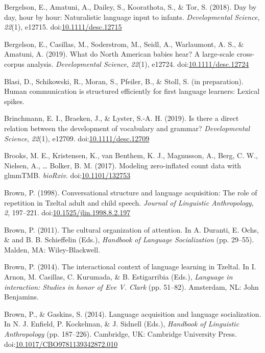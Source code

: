 \documentclass[floatsintext,man]{apa6}
\theoremstyle{definition}
\theoremstyle{definition}
\theoremstyle{definition}
\theoremstyle{remark}
\begin{document}
\hypertarget{ref-bergelson2018day}{}
Bergelson, E., Amatuni, A., Dailey, S., Koorathota, S., \& Tor, S.
(2018). Day by day, hour by hour: Naturalistic language input to
infants. \emph{Developmental Science}, \emph{22}(1), e12715.
doi:\href{https://doi.org/10.1111/desc.12715}{10.1111/desc.12715}

\hypertarget{ref-bergelsoncasillas2019what}{}
Bergelson, E., Casillas, M., Soderstrom, M., Seidl, A., Warlaumont, A.
S., \& Amatuni, A. (2019). What do North American babies hear? A
large-scale cross-corpus analysis. \emph{Developmental Science},
\emph{22}(1), e12724.
doi:\href{https://doi.org/10.1111/desc.12724}{10.1111/desc.12724}

\hypertarget{ref-blasiIPhuman}{}
Blasi, D., Schikowski, R., Moran, S., Pfeiler, B., \& Stoll, S. (in
preparation). Human communication is structured efficiently for first
language learners: Lexical spikes.

\hypertarget{ref-brinchmann2019direct}{}
Brinchmann, E. I., Braeken, J., \& Lyster, S.-A. H. (2019). Is there a
direct relation between the development of vocabulary and grammar?
\emph{Developmental Science}, \emph{22}(1), e12709.
doi:\href{https://doi.org/10.1111/desc.12709}{10.1111/desc.12709}

\hypertarget{ref-brooks2017modeling}{}
Brooks, M. E., Kristensen, K., van Benthem, K. J., Magnusson, A., Berg,
C. W., Nielsen, A., \ldots{} Bolker, B. M. (2017). Modeling
zero-inflated count data with glmmTMB. \emph{bioRxiv}.
doi:\href{https://doi.org/10.1101/132753}{10.1101/132753}

\hypertarget{ref-brown1998conversational}{}
Brown, P. (1998). Conversational structure and language acquisition: The
role of repetition in Tzeltal adult and child speech. \emph{Journal of
Linguistic Anthropology}, \emph{2}, 197--221.
doi:\href{https://doi.org/10.1525/jlin.1998.8.2.197}{10.1525/jlin.1998.8.2.197}

\hypertarget{ref-brown2011cultural}{}
Brown, P. (2011). The cultural organization of attention. In A. Duranti,
E. Ochs, \& and B. B. Schieffelin (Eds.), \emph{Handbook of Language
Socialization} (pp. 29--55). Malden, MA: Wiley-Blackwell.

\hypertarget{ref-brown2014interactional}{}
Brown, P. (2014). The interactional context of language learning in
Tzeltal. In I. Arnon, M. Casillas, C. Kurumada, \& B. Estigarribia
(Eds.), \emph{Language in interaction: Studies in honor of Eve V. Clark}
(pp. 51--82). Amsterdam, NL: John Benjamins.

\hypertarget{ref-brown2014language}{}
Brown, P., \& Gaskins, S. (2014). Language acquisition and language
socialization. In N. J. Enfield, P. Kockelman, \& J. Sidnell (Eds.),
\emph{Handbook of Linguistic Anthropology} (pp. 187--226). Cambridge,
UK: Cambridge University Press.
doi:\href{https://doi.org/10.1017/CBO9781139342872.010}{10.1017/CBO9781139342872.010}
\end{document}
